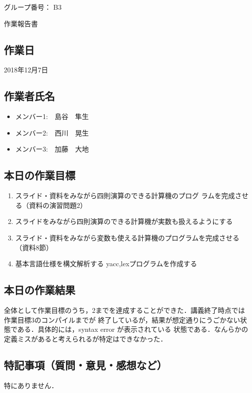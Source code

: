 \documentclass[a4j]{jarticle}
\begin{document}
\thispagestyle{empty}

\begin{flushright}
グループ番号： B3
\end{flushright}

\begin{center}
{\LARGE 作業報告書}
\end{center}

\subsection*{作業日}

2018年12月7日


\subsection*{作業者氏名}

\begin{itemize}
  \item メンバー1:　島谷　隼生
  \item メンバー2:　西川　晃生
  \item メンバー3:　加藤　大地
\end{itemize}

\subsection*{本日の作業目標}

\begin{enumerate}
\item
スライド・資料をみながら四則演算のできる計算機のプログ
ラムを完成させる（資料の演習問題2）
\item
スライドをみながら四則演算のできる計算機が実数も扱えるようにする
\item
スライド・資料をみながら変数も使える計算機のプログラムを完成させる（資料8節）
\item
基本言語仕様を構文解析する
yacc,lexプログラムを作成する

\end{enumerate}

\subsection*{本日の作業結果}

全体として作業目標のうち，2までを達成することができた．講義終了時点では作業目標3のコンパイルまでが
終了しているが，結果が想定通りにうごかない状態である．具体的には，syntax error が表示されている
状態である．なんらかの定義ミスがあると考えられるが特定はできなかった．


\subsection*{特記事項（質問・意見・感想など）}

特にありません．
\end{document}
